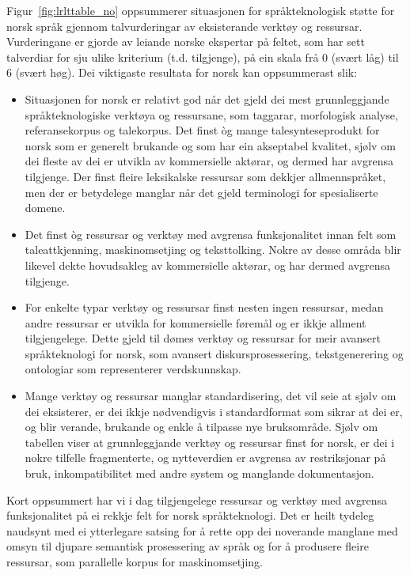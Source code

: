 \begin{multicols}{2}
Figur~\ref{fig:lrlttable_no} oppsummerer situasjonen for språkteknologisk støtte for norsk språk gjennom talvurderingar av eksisterande verktøy og ressursar. Vurderingane er gjorde av leiande norske ekspertar på feltet, som har sett talverdiar for sju ulike kriterium (t.d. tilgjenge), på ein skala frå 0 (svært låg) til 6 (svært høg). 
Dei viktigaste resultata for norsk kan oppsummerast slik: 

\begin{itemize}
\item Situasjonen for norsk er relativt god når det gjeld dei mest grunnleggjande språkteknologiske verktøya og ressursane, som taggarar, morfologisk analyse, referansekorpus og talekorpus.
Det finst òg mange talesynteseprodukt for norsk som er generelt brukande og som har ein akseptabel kvalitet, sjølv om dei fleste av dei er utvikla av kommersielle aktørar, og dermed har avgrensa tilgjenge. Der finst fleire leksikalske ressursar som dekkjer allmennspråket, men der er betydelege manglar når det gjeld terminologi for spesialiserte domene.
\item Det finst òg ressursar og verktøy med avgrensa funksjonalitet innan felt som taleattkjenning, maskinomsetjing og teksttolking. Nokre av desse områda blir likevel dekte hovudsakleg av kommersielle aktørar, og har dermed avgrensa tilgjenge.
\item For enkelte typar verktøy og ressursar finst nesten ingen ressursar, medan andre ressursar er utvikla for kommersielle føremål og er ikkje allment tilgjengelege. 
Dette gjeld til dømes verktøy og ressursar for meir avansert språkteknologi for norsk, som avansert diskursprosessering, tekstgenerering og ontologiar som representerer verdskunnskap.
\item Mange verktøy og ressursar manglar standardisering, det vil seie at sjølv om dei eksisterer, er dei ikkje nødvendigvis i standardformat som sikrar at dei er, og blir verande, brukande og enkle å tilpasse nye bruksområde.
Sjølv om tabellen viser at grunnleggjande verktøy og ressursar finst for norsk, er dei i nokre tilfelle fragmenterte, og nytteverdien er avgrensa av restriksjonar på bruk, inkompatibilitet med andre system og manglande dokumentasjon. 
\end{itemize}

Kort oppsummert har vi i dag tilgjengelege ressursar og verktøy med avgrensa funksjonalitet på ei rekkje felt for norsk språkteknologi.
Det er heilt tydeleg naudsynt med ei ytterlegare satsing for å rette opp dei noverande manglane med omsyn til djupare semantisk prosessering av språk og for å produsere fleire ressursar, som parallelle korpus for maskinomsetjing.


\end{multicols}

